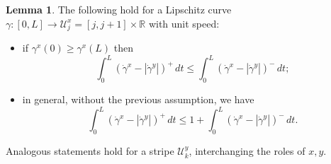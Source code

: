 \documentclass[11pt,a4paper]{amsart}
\newcommand{\R}{\mathbb{R}}
\theoremstyle{definition}
\newtheorem{lemmaen}[definition]{Lemma}
\newcommand{\str}{\mathcal{U}}
\begin{document}
\begin{lemmaen}\label{lemma.curve}
The following hold
for a Lipschitz curve $\gamma:[0,L]\to\str_j^x=[j,j+1]\times\R$ with unit speed:
\begin{itemize}
\item[(i)] if %
$\gamma^x(0)\ge\gamma^x(L)$
then
$$\int_0^L(\dot\gamma^x-|\dot\gamma^y|)^+\,dt
\le \int_0^L(\dot\gamma^x-|\dot\gamma^y|)^-\,dt;$$
\item[(ii)] %
in general, without the previous assumption, we have
$$\int_0^L(\dot\gamma^x-|\dot\gamma^y|)^+\,dt
\le 1+\int_0^L(\dot\gamma^x-|\dot\gamma^y|)^-\,dt.$$
\end{itemize}
Analogous statements hold for a stripe $\str_k^y$, interchanging the roles of $x,y$.
\end{lemmaen}
\end{document}
